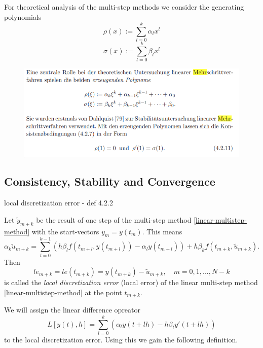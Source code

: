 	For theoretical analysis of the multi-step methods we consider the generating polynomials
	\begin{equation}
		\rho(x) := \sum_{l=0}^{k} \alpha_l x^l
	\end{equation}
	\begin{equation}
		\sigma(x) := \sum_{l=0}^{k} \beta_l x^l
	\end{equation}
	
	\begin{figure}[H]
		\centering
		\includegraphics[width=0.7\linewidth]{screenshot013}
		\caption{}
		\label{fig:screenshot013}
	\end{figure}
	
	
	\subsection{Consistency, Stability and Convergence}
	local discretization error - def 4.2.2
	\begin{definition}
		Let $\tilde{y}_{m+k}$ be the result of one step of the multi-step method \ref{linear-multistep-method} with the start-vectors $y_m = y(t_m)$. This means
		\begin{displaymath}
			\alpha_k \tilde{u}_{m+k} = \sum_{l=0}^{k-1} \left( h \beta_l f(t_{m+l}, y(t_{m+l})) - \alpha_l y(t_{m+l}) \right) + h \beta_k f(t_{m+k}, \tilde{u}_{m+k}) .
		\end{displaymath}
		Then
		\begin{displaymath}
			le_{m+k} = le(t_{m+k}) = y(t_{m+k}) - \tilde{u}_{m+k}, \quad m=0,1,...,N-k
		\end{displaymath}
		is called the \emph{local discretization error} (local error) of the linear multi-step method \ref{linear-multistep-method} at the point $t_{m+k}$.
	\end{definition}
	
	We will assign the linear difference opreator
	\begin{equation}
		L[y(t),h] = \sum_{l=0}^{k} \left( \alpha_l y(t+lh) - h \beta_l y'(t+lh) \right)
	\end{equation}
	to the local discretization error. Using this we gain the following definition.

